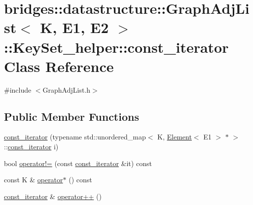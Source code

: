 \hypertarget{classbridges_1_1datastructure_1_1_graph_adj_list_1_1_key_set__helper_1_1const__iterator}{}\section{bridges\+:\+:datastructure\+:\+:Graph\+Adj\+List$<$ K, E1, E2 $>$\+:\+:Key\+Set\+\_\+helper\+:\+:const\+\_\+iterator Class Reference}
\label{classbridges_1_1datastructure_1_1_graph_adj_list_1_1_key_set__helper_1_1const__iterator}


{\ttfamily \#include $<$Graph\+Adj\+List.\+h$>$}

\subsection*{Public Member Functions}
\begin{DoxyCompactItemize}
\item 
\hyperlink{classbridges_1_1datastructure_1_1_graph_adj_list_1_1_key_set__helper_1_1const__iterator_a028172e70957f093f02ee95c77d89392}{const\+\_\+iterator} (typename std\+::unordered\+\_\+map$<$ K, \hyperlink{classbridges_1_1datastructure_1_1_element}{Element}$<$ E1 $>$ $\ast$ $>$\+::\hyperlink{classbridges_1_1datastructure_1_1_graph_adj_list_1_1_key_set__helper_1_1const__iterator}{const\+\_\+iterator} i)
\item 
bool \hyperlink{classbridges_1_1datastructure_1_1_graph_adj_list_1_1_key_set__helper_1_1const__iterator_a373e0c206d63dfda41108ebfcfae5fe8}{operator!=} (const \hyperlink{classbridges_1_1datastructure_1_1_graph_adj_list_1_1_key_set__helper_1_1const__iterator}{const\+\_\+iterator} \&it) const
\item 
const K \& \hyperlink{classbridges_1_1datastructure_1_1_graph_adj_list_1_1_key_set__helper_1_1const__iterator_a8369373435ffc6d6bfb3d5d5da13eea3}{operator$\ast$} () const
\item 
\hyperlink{classbridges_1_1datastructure_1_1_graph_adj_list_1_1_key_set__helper_1_1const__iterator}{const\+\_\+iterator} \& \hyperlink{classbridges_1_1datastructure_1_1_graph_adj_list_1_1_key_set__helper_1_1const__iterator_acbeb342b54bfdb8ece520e9d5cbf66db}{operator++} ()
\end{DoxyCompactItemize}


